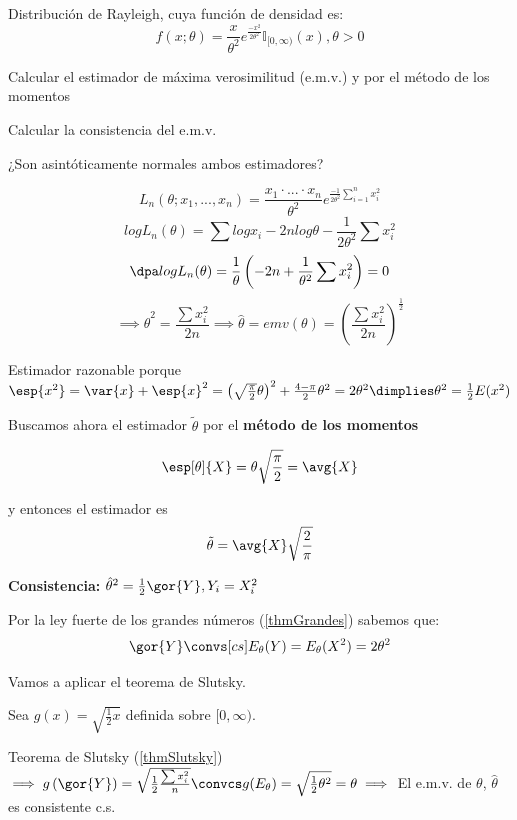 \begin{problem}[5]
Distribución de Rayleigh, cuya función de densidad es:
\[f(x;\theta) = \frac{x}{\theta^2} e^{\frac{-x^2}{2\theta^2}} \mathbb{I}_{[0,\infty)} (x), \theta > 0\]

\ppart Calcular el estimador de máxima verosimilitud (e.m.v.) y por el método de los momentos

\ppart Calcular la consistencia del e.m.v.

\ppart ¿Son asintóticamente normales ambos estimadores?

\solution

\spart

\[L_n(\theta;x_1,...,x_n) = \frac{x_1 \cdot ... \cdot x_n}{\theta^2} e^{\frac{-1}{2\theta^2} \sum_{i=1}^n x_i^2}\]
\[log L_n(\theta) = \sum log x_i - 2nlog\theta -\frac{1}{2\theta^2}\sum x_i^2\]
\[\dpa log L_n(\theta) = \frac{1}{\theta} \left(-2n+\frac{1}{\theta^2}\sum x_i^2\right) = 0\]
\[\implies \hat{\theta}^2 = \frac{\sum x_i^2}{2n} \implies \hat{\theta} =  emv(\theta) =\left(\frac{\sum x_i^2}{2n}\right)^{\frac{1}{2}}\]

Estimador razonable porque $\esp{x^2} = \var{x} + \esp{x}^2 = \left(\sqrt{\frac{\pi}{2}}\theta\right)^2 + \frac{4-\pi}{2} \theta^2 = 2\theta^2 \dimplies \theta^2 = \frac{1}{2} E(x^2)$

Buscamos ahora el estimador $\tilde\theta$ por el \textbf{método de los momentos}

\[ \esp[\theta]{X}= \theta\sqrt{\frac{\pi}{2}} = \avg{X} \] 

y entonces el estimador es \[\tilde{\theta} = \avg{X}\sqrt{\frac{2}{\pi}} \]

\spart

\textbf{Consistencia:} $\hat{\theta}^2 = \frac{1}{2} \gor{Y}, Y_i = X_i^2$

Por la ley fuerte de los grandes números (\ref{thmGrandes}) sabemos que:
\begin{gather*}
\gor{Y} \convs[cs] E_{\theta}(Y) = E_{\theta}(X^2) = 2\theta^2
\end{gather*}

Vamos a aplicar el teorema de Slutsky.

Sea $g(x) = \sqrt{\frac{1}{2}x}$ definida sobre $[0,\infty)$.

Teorema de Slutsky (\ref{thmSlutsky}) $\implies g\left(\gor{Y}\right) = \sqrt{\frac{1}{2} \frac{\sum x_i^2}{n}} \convcs g(E_{\theta}) = \sqrt{\frac{1}{2}\theta^2} = \theta \implies $ El e.m.v. de $\theta$, $\hat{\theta}$ es consistente c.s.


\end{problem}
